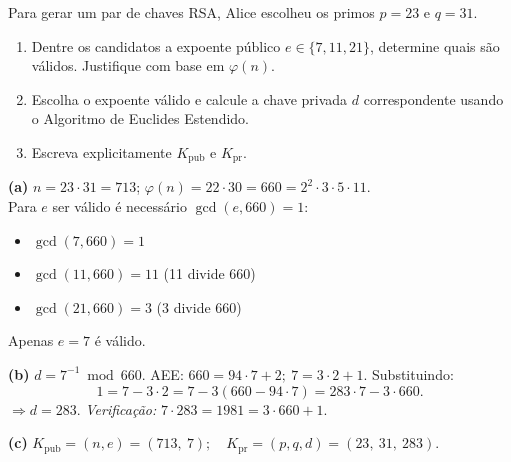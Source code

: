 \documentclass[12pt,a4paper]{article}
\newcommand{\xmark}{\ding{55}}
\begin{document}
\begin{exercicio}
Para gerar um par de chaves RSA, Alice escolheu os primos $p = 23$ e $q = 31$.
\begin{enumerate}[label=(\alph*)]
    \item Dentre os candidatos a expoente p\'{u}blico $e \in \{7, 11, 21\}$, determine quais s\~{a}o v\'{a}lidos. Justifique com base em $\varphi(n)$.
    \item Escolha o expoente v\'{a}lido e calcule a chave privada $d$ correspondente usando o Algoritmo de Euclides Estendido.
    \item Escreva explicitamente $K_{\text{pub}}$ e $K_{\text{pr}}$.
\end{enumerate}

\begin{resposta}
\textbf{(a)} $n = 23 \cdot 31 = 713$; $\varphi(n) = 22 \cdot 30 = 660 = 2^2 \cdot 3 \cdot 5 \cdot 11$. \\
Para $e$ ser v\'{a}lido \'{e} necess\'{a}rio $\gcd(e, 660) = 1$:
\begin{itemize}[leftmargin=1.4em,topsep=2pt,itemsep=1pt]
    \item $\gcd(7,660) = 1$ \checkmark
    \item $\gcd(11,660) = 11$ \xmark (11 divide 660)
    \item $\gcd(21,660) = 3$ \xmark (3 divide 660)
\end{itemize}
Apenas $e = 7$ \'{e} v\'{a}lido.

\textbf{(b)} $d = 7^{-1} \bmod 660$. AEE: $660 = 94 \cdot 7 + 2;\ 7 = 3 \cdot 2 + 1$. Substituindo:
\[
1 = 7 - 3 \cdot 2 = 7 - 3(660 - 94 \cdot 7) = 283 \cdot 7 - 3 \cdot 660.
\]
$\Rightarrow d = 283$. \emph{Verifica\c{c}\~{a}o:} $7 \cdot 283 = 1981 = 3 \cdot 660 + 1$. \checkmark

\textbf{(c)} $K_{\text{pub}} = (n, e) = (713,\ 7);\quad K_{\text{pr}} = (p, q, d) = (23,\ 31,\ 283).$
\end{resposta}
\end{exercicio}
\end{document}
